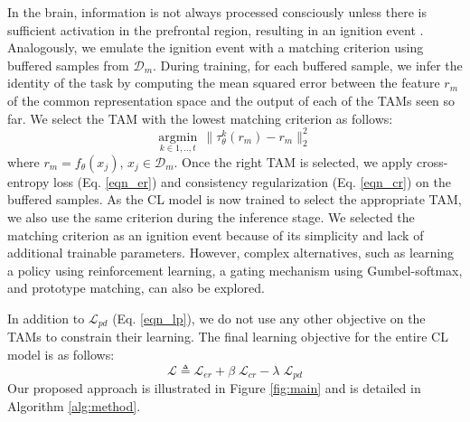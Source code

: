 \documentclass{article} %
\begin{document}
In the brain, information is not always processed consciously unless there is sufficient activation in the prefrontal region, resulting in an ignition event \citep{juliani2022link}. Analogously, we emulate the ignition event with a matching criterion using buffered samples from $\mathcal{D}_m$. During training, for each buffered sample, we infer the identity of the task by computing the mean squared error between the feature $r_m$ of the common representation space and the output of each of the TAMs seen so far. We select the TAM with the lowest matching criterion as follows:
\begin{equation}
\label{eqn_criterion}
 \underset{k \in {1,..,t}}{\mathrm{argmin}}\:\:  \lVert \tau^{k}_{\theta}(r_m) - r_m \rVert^2_{2}  
\end{equation}
where $r_m = f_\theta(x_j)$, $x_j\in\mathcal{D}_m$. Once the right TAM is selected, we apply cross-entropy loss (Eq. \ref{eqn_er}) and consistency regularization (Eq. \ref{eqn_cr}) on the buffered samples. As the CL model is now trained to select the appropriate TAM, we also use the same criterion during the inference stage. We selected the matching criterion as an ignition event because of its simplicity and lack of additional trainable parameters. However, complex alternatives, such as learning a policy using reinforcement learning, a gating mechanism using Gumbel-softmax, and prototype matching, can also be explored. 

In addition to $\mathcal{L}_{pd}$ (Eq. \ref{eqn_lp}), we do not use any other objective on the TAMs to constrain their learning. The final learning objective for the entire CL model is as follows:
\begin{equation}
\label{eqn_final}
    \mathcal{L} \triangleq \mathcal{L}_{er} + \beta \;\mathcal{L}_{cr} - \lambda \;\mathcal{L}_{pd} 
\end{equation}
Our proposed approach is illustrated in Figure \ref{fig:main} and is detailed in Algorithm \ref{alg:method}.

\end{document}

